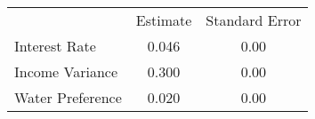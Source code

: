 \begin{tabular}{lcc}
& Estimate & Standard Error \\
Interest Rate &0.046&0.00\\
Income Variance &0.300&0.00\\
Water Preference &0.020&0.00\\
\end{tabular} 
